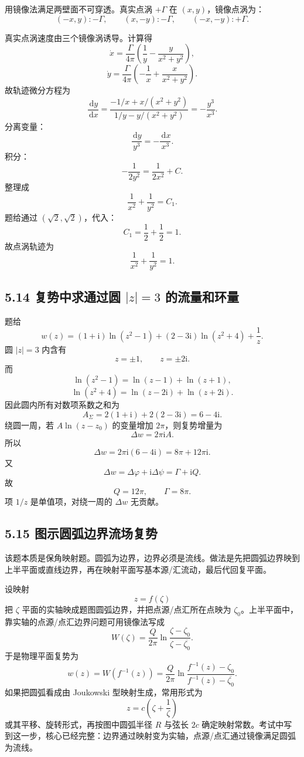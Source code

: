 \documentclass[UTF8,zihao=-4]{ctexart}
\newcommand{\dd}{\,\mathrm d}
\newcommand{\ii}{\mathrm i}
\begin{document}
用镜像法满足两壁面不可穿透。真实点涡 \(+\Gamma\) 在 \((x,y)\)，镜像点涡为：
\[
(-x,y):-\Gamma,\qquad (x,-y):-\Gamma,\qquad (-x,-y):+\Gamma .
\]

真实点涡速度由三个镜像涡诱导。计算得
\[
\dot x=\frac{\Gamma}{4\pi}\left(\frac1y-\frac{y}{x^2+y^2}\right),
\]
\[
\dot y=\frac{\Gamma}{4\pi}\left(-\frac1x+\frac{x}{x^2+y^2}\right).
\]
故轨迹微分方程为
\[
\frac{\dd y}{\dd x}
=\frac{-1/x+x/(x^2+y^2)}
{1/y-y/(x^2+y^2)}
=-\frac{y^3}{x^3}.
\]
分离变量：
\[
\frac{\dd y}{y^3}=-\frac{\dd x}{x^3}.
\]
积分：
\[
-\frac1{2y^2}=\frac1{2x^2}+C.
\]
整理成
\[
\frac1{x^2}+\frac1{y^2}=C_1.
\]
题给通过 \((\sqrt2,\sqrt2)\)，代入：
\[
C_1=\frac12+\frac12=1.
\]
故点涡轨迹为
\[
\boxed{\frac1{x^2}+\frac1{y^2}=1.}
\]

\subsection*{5.14 复势中求通过圆 \(|z|=3\) 的流量和环量}

题给
\[
w(z)=(1+\ii)\ln(z^2-1)+(2-3\ii)\ln(z^2+4)+\frac1z .
\]
圆 \(|z|=3\) 内含有
\[
z=\pm1,\qquad z=\pm2\ii .
\]
而
\[
\ln(z^2-1)=\ln(z-1)+\ln(z+1),
\]
\[
\ln(z^2+4)=\ln(z-2\ii)+\ln(z+2\ii).
\]
因此圆内所有对数项系数之和为
\[
A_\Sigma=2(1+\ii)+2(2-3\ii)=6-4\ii .
\]
绕圆一周，若 \(A\ln(z-z_0)\) 的变量增加 \(2\pi\)，则复势增量为
\[
\Delta w=2\pi\ii A.
\]
所以
\[
\Delta w=2\pi\ii(6-4\ii)=8\pi+12\pi\ii .
\]
又
\[
\Delta w=\Delta\varphi+\ii\Delta\psi=\Gamma+\ii Q.
\]
故
\[
\boxed{Q=12\pi,\qquad \Gamma=8\pi.}
\]
项 \(1/z\) 是单值项，对绕一周的 \(\Delta w\) 无贡献。

\subsection*{5.15 图示圆弧边界流场复势}

该题本质是保角映射题。圆弧为边界，边界必须是流线。做法是先把圆弧边界映到上半平面或直线边界，再在映射平面写基本源/汇流动，最后代回复平面。

设映射
\[
z=f(\zeta)
\]
把 \(\zeta\) 平面的实轴映成题图圆弧边界，并把点源/点汇所在点映为 \(\zeta_0\)。上半平面中，靠实轴的点源/点汇边界问题可用镜像法写成
\[
W(\zeta)=\frac{Q}{2\pi}
\ln\frac{\zeta-\zeta_0}{\zeta-\overline{\zeta_0}} .
\]
于是物理平面复势为
\[
\boxed{
w(z)=W(f^{-1}(z))
=\frac{Q}{2\pi}
\ln\frac{f^{-1}(z)-\zeta_0}
{f^{-1}(z)-\overline{\zeta_0}}.}
\]
如果把圆弧看成由 Joukowski 型映射生成，常用形式为
\[
z=c\left(\zeta+\frac1\zeta\right)
\]
或其平移、旋转形式，再按图中圆弧半径 \(R\) 与弦长 \(2c\) 确定映射常数。考试中写到这一步，核心已经完整：边界通过映射变为实轴，点源/点汇通过镜像满足圆弧为流线。
\end{document}

